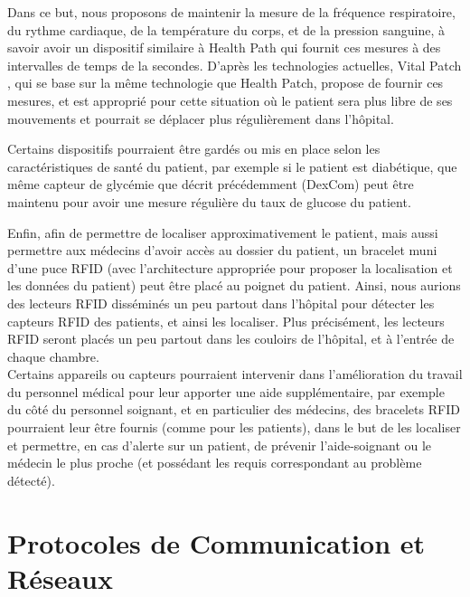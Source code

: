 \documentclass{article}
\begin{document}
Dans ce but, nous proposons de maintenir la mesure de la fréquence respiratoire, du rythme cardiaque, de la température du corps, et de la pression sanguine, à savoir avoir un dispositif similaire à Health Path qui fournit ces mesures à des intervalles de temps de la secondes. D’après les technologies actuelles, Vital Patch \cite{VitalPatch}, qui se base sur la même technologie que Health Patch, propose de fournir ces mesures, et est approprié pour cette situation où le patient sera plus libre de ses mouvements et pourrait se déplacer plus régulièrement dans l’hôpital.

Certains dispositifs pourraient être gardés ou mis en place selon les caractéristiques de santé du patient, par exemple si le patient est diabétique, que même capteur de glycémie que décrit précédemment (DexCom) peut être maintenu pour avoir une mesure régulière du taux de glucose du patient.

Enfin, afin de permettre de localiser approximativement le patient, mais aussi permettre aux médecins d’avoir accès au dossier du patient, un bracelet muni d’une puce RFID (avec l’architecture appropriée pour proposer la localisation et les données du patient) peut être placé au poignet du patient. Ainsi, nous aurions des lecteurs RFID disséminés un peu partout dans l’hôpital pour détecter les capteurs RFID des patients, et ainsi les localiser. Plus précisément, les lecteurs RFID seront placés un peu partout dans les couloirs de l’hôpital, et à l’entrée de chaque chambre.
\\

Certains appareils ou capteurs pourraient intervenir dans l'amélioration du travail du personnel médical pour leur apporter une aide supplémentaire, par exemple du côté du personnel soignant, et en particulier des médecins, des bracelets RFID \cite{BraceletRFID} pourraient leur être fournis (comme pour les patients), dans le but de les localiser et permettre, en cas d’alerte sur un patient, de prévenir l’aide-soignant ou le médecin le plus proche (et possédant les requis correspondant au problème détecté).

\section {Protocoles de Communication et Réseaux}
\end{document}
